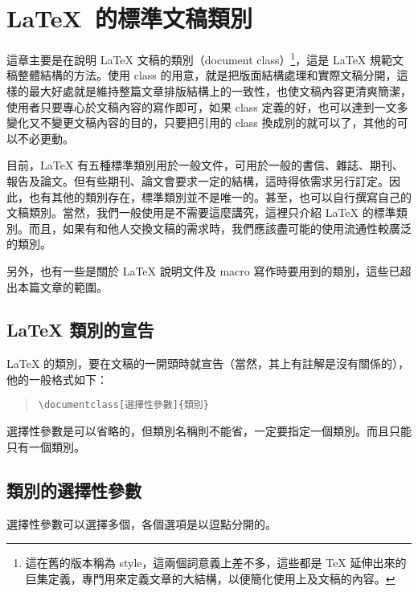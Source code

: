 
\chapter{\LaTeX\ 的標準文稿類別}
\label{ch:class}

這章主要是在說明 \LaTeX{} 文稿的類別（document class）\footnote{這在舊的版本稱為 style，這兩個詞意義上差不多，這些都是 \TeX{} 延伸出來的巨集定義，專門用來定義文章的大結構，以便簡化使用上及文稿的內容。}，這是 \LaTeX{} 規範文稿整體結構的方法。使用 class 的用意，就是把版面結構處理和實際文稿分開，這樣的最大好處就是維持整篇文章排版結構上的一致性，也使文稿內容更清爽簡潔，使用者只要專心於文稿內容的寫作即可，如果 class 定義的好，也可以達到一文多變化又不變更文稿內容的目的，只要把引用的 class 換成別的就可以了，其他的可以不必更動。

目前，\LaTeX{} 有五種標準類別用於一般文件，可用於一般的書信、雜誌、期刊、報告及論文。但有些期刊、論文會要求一定的結構，這時得依需求另行訂定。因此，也有其他的類別存在，標準類別並不是唯一的。甚至，也可以自行撰寫自己的文稿類別。當然，我們一般使用是不需要這麼講究，這裡只介紹 \LaTeX{} 的標準類別。而且，如果有和他人交換文稿的需求時，我們應該盡可能的使用流通性較廣泛的類別。

另外，也有一些是關於 \LaTeX{} 說明文件及 macro 寫作時要用到的類別，這些已超出本篇文章的範圍。

\section{\LaTeX{} 類別的宣告}

\LaTeX{} 的類別，要在文稿的一開頭時就宣告（當然，其上有註解是沒有關係的），他的一般格式如下：

\begin{quote}
   \begin{verbatim}
\documentclass[選擇性參數]{類別}
\end{verbatim}
\end{quote}

選擇性參數是可以省略的，但類別名稱則不能省，一定要指定一個類別。而且只能只有一個類別。

\section{類別的選擇性參數}

選擇性參數可以選擇多個，各個選項是以逗點分開的。

